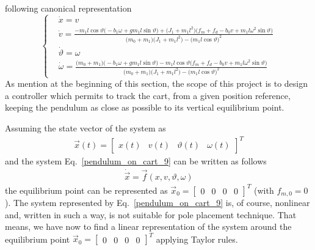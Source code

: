 \documentclass[11pt,a4paper,oneside]{book}
\numberwithin{equation}{section}
\theoremstyle{it}
\theoremstyle{definition}
\begin{document}
following canonical representation
\begin{equation}\label{pendulum_on_cart_9}
	\left\lbrace 	\begin{aligned}
		&\dot{x}=v \\[6pt]
		&\dot{v}=\frac{-m_1l\cos\vartheta 
			\big(-b_1\omega+gm_1l\sin\vartheta\big) + \big(J_1+m_1l^2\big) 
			\big(f_m+f_d-b_0v+m_1l\omega^2 \sin\vartheta\big)}{\big(m_0+m_1\big) 
			\big(J_1+m_1l^2\big) -\big(m_1l\cos\vartheta\big)^2}\\[6pt]
		&\dot{\vartheta}=\omega\\[6pt]
		&\dot{\omega}=\frac{\big(m_0+m_1\big) \big(-b_1\omega + 
			gm_1l\sin\vartheta\big) -m_1l\cos\vartheta \big(f_m+f_d-b_0v+m_1l\omega^2 
			\sin\vartheta\big) }{\big(m_0+m_1\big)
			\big(J_1+m_1l^2\big) - \big(m_1l\cos\vartheta\big)^2}
	\end{aligned}\right. 
\end{equation}
As mention at the beginning of this section, the scope of this project is to design a controller which permits to track the cart, from a given position reference, keeping the pendulum as close as possible to its vertical equilibrium point. 

Assuming the state vector of the system as
\begin{equation}\label{pendulum_on_cart_10}
	\begin{aligned}
		\vec{x}(t)=\begin{bmatrix} x(t)&v(t)&\vartheta(t)&\omega(t)\end{bmatrix}^T
	\end{aligned}
\end{equation}
and the system Eq.~\eqref{pendulum_on_cart_9} can be written as follows
\begin{equation}\label{pendulum_on_cart_10b}
	\begin{aligned}
		\dot{\vec{x}}=\vec{f}(x,v,\vartheta,\omega)
	\end{aligned}
\end{equation}
the equilibrium point can be represented as $\vec{x}_0=\begin{bmatrix} 0&0&0&0\end{bmatrix}^T$ (with $f_{m,0}=0$). 
The system represented by Eq.~\eqref{pendulum_on_cart_9} is, of course, nonlinear and, written in such a way, is not suitable for pole placement technique. That means, we have now to find a linear representation of the system around the equilibrium point $\vec{x}_0=\begin{bmatrix} 0&0&0&0\end{bmatrix}^T$ applying Taylor rules.
\end{document}
